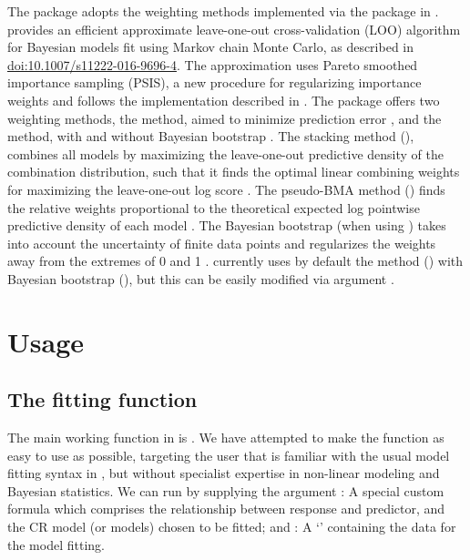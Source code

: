 \documentclass[
  shortnames]{jss}
\newcommand{\cls}[1]{`\code{#1}'}
\begin{document}
The  package adopts the weighting methods implemented via the  \citep{vehtari2020} package in .  provides an efficient approximate leave-one-out cross-validation (LOO) algorithm for Bayesian models fit using Markov chain Monte Carlo, as described in \citep{vehtari2017} \url{doi:10.1007/s11222-016-9696-4}. The approximation uses Pareto smoothed importance sampling (PSIS), a new procedure for regularizing importance weights and follows the implementation described in \citep{Vehtari2019}. The  package offers two weighting methods, the  method, aimed to minimize prediction error \citep{Yao2018}, and the  method, with and without Bayesian bootstrap \citep{vehtari2020, vehtari2017}. The stacking method (), combines all models by maximizing the leave-one-out predictive density of the combination distribution, such that it finds the optimal linear combining weights for maximizing the leave-one-out log score \citep{vehtari2020}. The pseudo-BMA method () finds the relative weights proportional to the theoretical expected log pointwise predictive density of each model \citep{vehtari2020}. The Bayesian bootstrap (when using ) takes into account the uncertainty of finite data points and regularizes the weights away from the extremes of 0 and 1 \citep{vehtari2020}.  currently uses by default the  method () with Bayesian bootstrap (), but this can be easily modified via argument .

\hypertarget{usage}{%
\section{Usage}\label{usage}}

\subsection[The fitting function bnec()]{The fitting function }\label{ffbnec}

The main working function in  is . We have attempted to make the  function as easy to use as possible, targeting the  user that is familiar with the usual model fitting syntax in , but without specialist expertise in non-linear modeling and Bayesian statistics. We can run  by supplying the argument : A special custom formula which comprises the relationship between response and predictor, and the CR model (or models) chosen to be fitted; and : A \cls{data.frame} containing the data for the model fitting.
\end{document}

